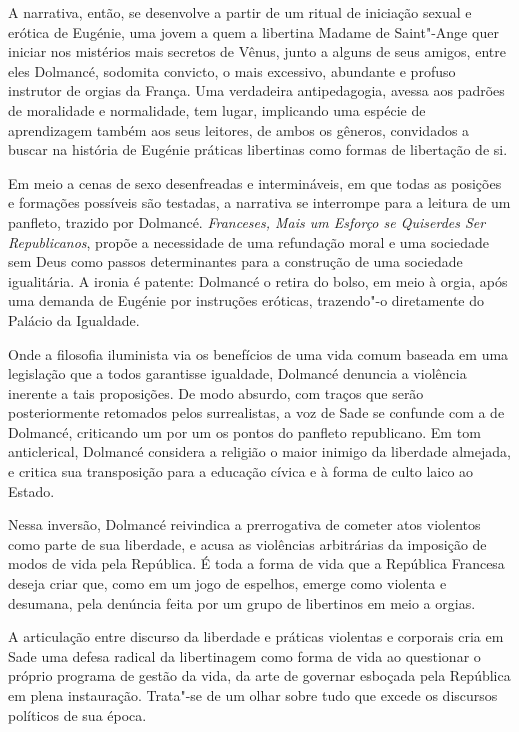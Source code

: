 A narrativa, então, se desenvolve a partir de um ritual de iniciação
sexual e erótica de Eugénie, uma jovem a quem a libertina Madame de
Saint"-Ange quer iniciar nos mistérios mais secretos de Vênus, junto a
alguns de seus amigos, entre eles Dolmancé, sodomita convicto, o mais
excessivo, abundante e profuso instrutor de orgias da França. Uma
verdadeira antipedagogia, avessa aos padrões de moralidade e
normalidade, tem lugar, implicando uma espécie de aprendizagem também aos
seus leitores, de ambos os gêneros, convidados a buscar na
história de Eugénie práticas libertinas como formas de libertação
de si.

Em meio a cenas de sexo desenfreadas e intermináveis, em que todas as
posições e formações possíveis são testadas, a narrativa se interrompe
para a leitura de um panfleto, trazido por Dolmancé. \emph{Franceses,
Mais um Esforço se Quiserdes Ser Republicanos}, propõe a
necessidade de uma refundação moral e uma sociedade sem Deus como passos
determinantes para a construção de uma sociedade igualitária. A ironia é
patente: Dolmancé o retira do bolso, em meio à orgia, após uma demanda
de Eugénie por instruções eróticas, trazendo"-o diretamente do Palácio da
Igualdade.

Onde a filosofia iluminista via os benefícios de uma vida comum baseada
em uma legislação que a todos garantisse igualdade, Dolmancé denuncia a
violência inerente a tais proposições. De modo absurdo, com traços que
serão posteriormente retomados pelos surrealistas, a voz de Sade se confunde
com a de Dolmancé, criticando um por um os
pontos do panfleto republicano. Em tom anticlerical, Dolmancé considera a
religião o maior inimigo da liberdade almejada, e critica sua transposição
para a educação cívica e à forma de culto laico ao Estado.

Nessa inversão, Dolmancé reivindica a prerrogativa de cometer atos
violentos como parte de sua liberdade, e acusa as violências arbitrárias
da imposição de modos de vida pela República. É toda a forma de
vida que a República Francesa deseja criar que, como em um jogo de
espelhos, emerge como violenta e desumana, pela denúncia feita
por um grupo de libertinos em meio a orgias.

A articulação entre
discurso da liberdade e práticas violentas e corporais cria em Sade uma
defesa radical da libertinagem como forma de vida ao questionar o
próprio programa de gestão da vida, da arte de governar esboçada pela
República em plena instauração. Trata"-se de um olhar sobre tudo que
excede os discursos políticos de sua época.

